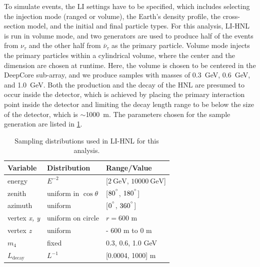 \documentclass[
    aps,
    prd,
    reprint,
    amsmath,
    amssymb,
    nofootinbib,
    linenumbers,
    superscriptaddress,
    floatfix
]{revtex4-2}
\newcommand{\gev}{\giga\electronvolt}
\begin{document}
To simulate events, the LI settings have to be specified, which includes selecting the injection mode (ranged or volume), the Earth's density profile, the cross-section model, and the initial and final particle types.
For this analysis, LI-HNL is run in volume mode, and two generators are used to produce half of the events from $\nu_\tau$ and the other half from $\bar{\nu}_\tau$ as the primary particle. Volume mode injects the primary particles within a cylindrical volume, where the center and the dimension are chosen at runtime. Here, the volume is chosen to be centered in the DeepCore sub-array, and we produce samples with masses of \SI{0.3}{\gev}, \SI{0.6}{\gev}, and \SI{1.0}{\gev}.
Both the production and the decay of the HNL are presumed to occur inside the detector, which is achieved by placing the primary interaction point inside the detector and limiting the decay length range to be below the size of the detector, which is $\sim$\SI{1000}{\meter}. The parameters chosen for the sample generation are listed in \cref{tab:sampling_dists}. 

\begin{table}[h]
    \small
    \begin{tabular}{ lll }
    \hline\hline    
    \textbf{Variable} & \textbf{Distribution} & \textbf{Range/Value} \\     
    \hline\hline    
    energy & $E^{-2}$  & [$\SI{2}{\gev}$, $\SI{10000}{\gev}$] \\
    zenith & uniform in $\cos{\theta}$ & [$80^{\degree}$, $180^{\degree}$] \\
    azimuth& uniform & [$0^{\degree}$, $360^{\degree}$] \\
    vertex \textit{x, y}& uniform on circle & $r=600$ m \\
    vertex \textit{z} & uniform  & - 600 m  to 0 m \\
    $m_4$& fixed & {0.3, 0.6, 1.0} GeV \\
    $L_{\textrm{decay}}$ & $L^{-1}$ & [0.0004, 1000] m \\
    \hline
\end{tabular}
\internallinenumbers
\caption{Sampling distributions used in LI-HNL for this analysis.}
\label{tab:sampling_dists}
\end{table}
\end{document}
